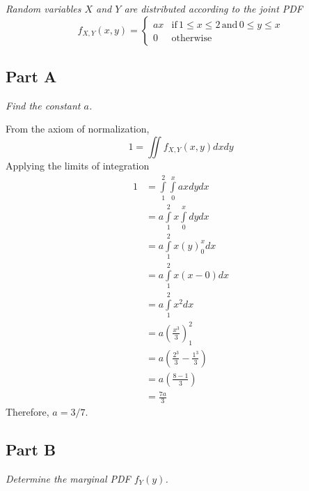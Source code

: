 \documentclass{article}
\begin{document}
\textit{Random variables $ X $ and $ Y $ are distributed according to the
joint PDF}
$$ f_{X,Y}(x, y) = \begin{cases}
    ax & \mathrm{if} \, 1 \leq x \leq 2 \, \mathrm{and} \, 0 \leq y \leq x \\
    0 & \mathrm{otherwise}
\end{cases} $$

\subsection*{Part A}

\textit{Find the constant $ a $.}

\bigbreak

From the axiom of normalization, 
$$ 1 = \iint f_{X,Y}(x, y) dx dy $$
Applying the limits of integration
\begin{align*}
    1 &= \int\limits_1^2 \int\limits_0^x a x dy dx \\
      &= a \int\limits_1^2 x \int\limits_0^x dy dx \\
      &= a \int\limits_1^2 x \left( y \right)_0^x dx \\
      &= a \int\limits_1^2 x \left( x - 0 \right) dx \\
      &= a \int\limits_1^2 x^2 dx \\
      &= a \left( \frac{x^3}{3} \right)_1^2 \\
      &= a \left( \frac{2^3}{3} - \frac{1^3}{3} \right) \\
      &= a \left( \frac{8 - 1}{3} \right) \\
      &= \frac{7 a}{3}
\end{align*}
Therefore, $ a = 3 / 7 $.

\subsection*{Part B}

\textit{Determine the marginal PDF $ f_Y(y) $.}

\bigbreak
\end{document}

